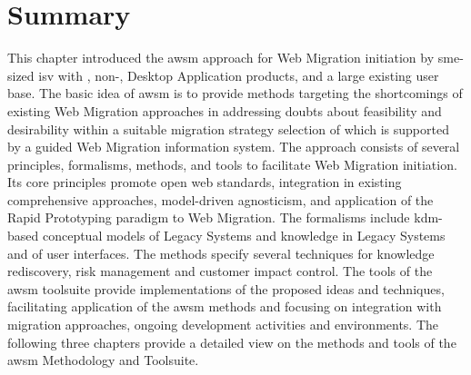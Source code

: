 

\section{Summary}
This chapter introduced the \gls{awsm} approach for \gls{Web Migration} initiation by \gls{sme}-sized \gls{isv} with , non-, \gls{Desktop Application} products, and a large existing user base.
The basic idea of \gls{awsm} is to provide methods targeting the shortcomings of existing \gls{Web Migration} approaches in addressing doubts about feasibility and desirability within a suitable migration strategy selection of which is supported by a guided \gls{Web Migration} information system.
The approach consists of several principles, formalisms, methods, and tools to facilitate \gls{Web Migration} initiation.
Its core principles promote open \gls{web} standards, integration in existing comprehensive approaches, model-driven agnosticism, and application of the \gls{Rapid Prototyping} paradigm to \gls{Web Migration}.
The formalisms include \gls{kdm}-based conceptual models of \glspl{Legacy System} and knowledge in \glspl{Legacy System} and of  user interfaces.
The methods specify several techniques for knowledge rediscovery, \gls{risk management} and customer impact control.
The tools of the \gls{awsm} toolsuite provide implementations of the proposed ideas and techniques, facilitating application of the \gls{awsm} methods and focusing on integration with migration approaches, ongoing development activities and environments.
The following three chapters provide a detailed view on the methods and tools of the \gls{awsm} Methodology and Toolsuite.